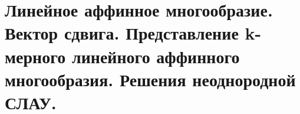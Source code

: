 \section{
    Линейное аффинное многообразие. Вектор сдвига. Представление k-мерного линейного аффинного многообразия. Решения неоднородной СЛАУ. 
}
